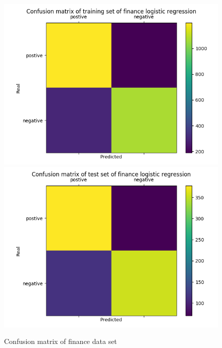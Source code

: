 \documentclass{article}
\begin{document}
\begin{figure}[h]
  \centering
  \includegraphics[scale=0.3]{finance_lo_train.png}
  \includegraphics[scale=0.3]{finance_lo_test.png}
  \caption{Confusion matrix of finance data set}
\end{figure}
\end{document}
